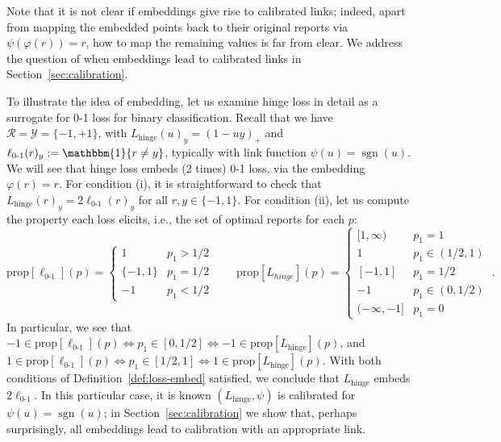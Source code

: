 \documentclass[12pt]{article}
\newcommand{\Comments}{1}
\newcommand{\mynote}[2]{\ifnum\Comments=1\textcolor{#1}{#2}\fi}
\newcommand{\bo}[1]{\mynote{blue}{[Bo: #1]}}
\newcommand{\prop}[1]{\mathrm{prop}[#1]}
\newcommand{\R}{\mathcal{R}}
\newcommand{\Y}{\mathcal{Y}}
\newcommand{\ones}{\mathbbm{1}}
\newcommand{\Ind}[1]{\ones\{#1\}}
\newcommand{\hinge}{L_{\mathrm{hinge}}}
\newcommand{\ellzo}{\ell_{\text{0-1}}}
\DeclareMathOperator*{\sgn}{sgn}
\begin{document}
Note that it is not clear if embeddings give rise to calibrated links; indeed, apart from mapping the embedded points back to their original reports via $\psi(\varphi(r)) = r$, how to map the remaining values is far from clear.
We address the question of when embeddings lead to calibrated links in Section~\ref{sec:calibration}.


To illustrate the idea of embedding, let us examine hinge loss in detail as a surrogate for 0-1 loss for binary classification.
Recall that we have $\R = \Y = \{-1, +1\}$, with $\hinge(u)_y = (1 - uy)_+$ and $\ellzo(r)_y := \Ind{r\neq y}$, typically with link function $\psi(u) = \sgn(u)$.
We will see that hinge loss embeds (2 times) 0-1 loss, via the embedding $\varphi(r) = r$.
For condition (i), it is straightforward to check that $\hinge(r)_y = 2\ellzo(r)_y$ for all $r,y\in\{-1,1\}$.
For condition (ii), let us compute the property each loss elicits, i.e., the set of optimal reports for each $p$:
\[
\prop{\ellzo}(p) = \begin{cases}
1 & p_1 > 1/2 \\
\{-1,1\} & p_1 = 1/2\\
-1 & p_1 < 1/2
\end{cases}
\qquad
\prop{L_{hinge}}(p) = \begin{cases}
[1,\infty) & p_1 = 1\\
1 & p_1 \in (1/2,1) \\
[-1,1] & p_1 = 1/2\\
-1& p_1 \in (0, 1/2)\\
(-\infty, -1]& p_1 = 0
\end{cases}~.
\]
In particular, we see that $-1 \in \prop{\ellzo}(p) \iff p_1 \in [0, 1/2] \iff -1 \in \prop{\hinge}(p)$, and $1 \in \prop{\ellzo}(p) \iff p_1 \in [1/2,1] \iff 1 \in \prop{\hinge}(p)$.
With both conditions of Definition~\ref{def:loss-embed} satisfied, we conclude that $\hinge$ embeds $2\ellzo$.
In this particular case, it is known $(\hinge,\psi)$ is calibrated for $\psi(u) = \sgn(u)$; in Section~\ref{sec:calibration} we show that, perhaps surprisingly, all embeddings lead to calibration with an appropriate link.
\end{document}

